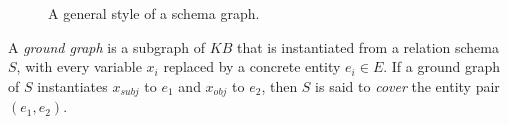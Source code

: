 \begin{figure}[th]
\centering
\caption{A general style of a schema graph.}
\label{fig:schema-example}
\end{figure}

A \textit{ground graph} is a subgraph of $KB$ that is
instantiated from a relation schema $S$, with
every variable $x_i$ replaced by a concrete entity $e_i \in E$.
If a ground graph of $S$ instantiates $x_{subj}$ to $e_1$ and $x_{obj}$ to
$e_2$, then $S$ is said to {\em cover} the entity pair $(e_1, e_2)$.

